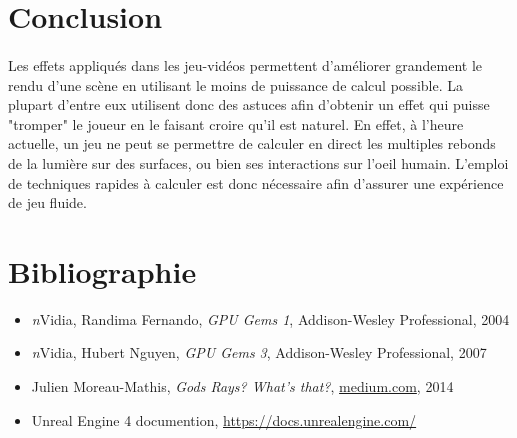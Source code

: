 \documentclass[a4paper]{article}
\begin{document}
\section*{Conclusion}
\label{sec:concl}
\paragraph{} Les effets appliqués dans les jeu-vidéos permettent d'améliorer grandement le rendu d'une scène en utilisant le moins de puissance de calcul possible. La plupart d'entre eux utilisent donc des astuces afin d'obtenir un effet qui puisse "tromper" le joueur en le faisant croire qu'il est naturel. En effet, à l'heure actuelle, un jeu ne peut se permettre de calculer en direct les multiples rebonds de la lumière sur des surfaces, ou bien ses interactions sur l'oeil humain. L'emploi de techniques rapides à calculer est donc nécessaire afin d'assurer une expérience de jeu fluide.

\section*{Bibliographie}
\label{sec:bib}

\begin{itemize}
\item \textit{n}Vidia, Randima Fernando, \textit{GPU Gems 1}, Addison-Wesley Professional, 2004
\item \textit{n}Vidia, Hubert Nguyen, \textit{GPU Gems 3}, Addison-Wesley Professional, 2007
\item Julien Moreau-Mathis, \textit{Gods Rays? What's that?},  \url{medium.com}, 2014
\item Unreal Engine 4 documention, \url{https://docs.unrealengine.com/}
\end{itemize}
 
\end{document}
